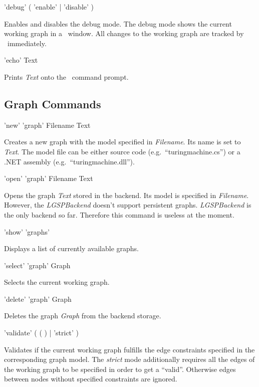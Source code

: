 \begin{rail}
  'debug' ( 'enable' | 'disable' )
\end{rail} 
Enables and disables the debug mode. The debug mode shows the current working graph in a \yComp\ window. All changes to the working graph are tracked by \yComp\ immediately.  

\begin{rail}
  'echo' Text
\end{rail}
Prints \emph{Text} onto the \GrShell\ command prompt.

\subsection{Graph Commands}
\label{graphcommands}

\begin{rail}
  'new' 'graph' Filename Text 
\end{rail}
Creates a new graph with the model specified in \emph{Filename}. Its name is set to \emph{Text}. The model file can be either source code (e.g.\ ``turing\textunderscore machine.cs'') or a .NET assembly (e.g.\ ``turing\textunderscore machine.dll'').

\begin{rail}
  'open' 'graph' Filename Text
\end{rail}
Opens the graph \emph{Text} stored in the backend. Its model is specified in \emph{File\-name}. However, the \emph{LGSPBackend} doesn't support persistent graphs. \emph{LGSPBackend} is the only backend so far. Therefore this command is useless at the moment.

\begin{rail}
  'show' 'graphs'
\end{rail}
Displays a list of currently available graphs.

\begin{rail}
  'select' 'graph' Graph
\end{rail}
Selects the current working graph.

\begin{rail}
  'delete' 'graph' Graph
\end{rail}
Deletes the graph \emph{Graph} from the backend storage.

\begin{rail}
  'validate' ( ( ) | 'strict' )
\end{rail}
Validates if the current working graph fulfills the edge constraints specified in the corresponding graph model. The \emph{strict} mode additionally requires all the edges of the working graph to be specified in order to get a ``valid''. Otherwise edges between nodes without specified constraints are ignored.\\

